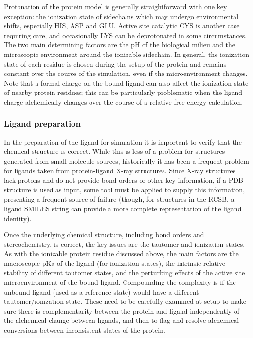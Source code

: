 \documentclass[9pt,bestpractices]{livecoms}
\begin{document}
Protonation of the protein model is generally straightforward with one key exception: the ionization state of sidechains which may undergo environmental shifts, especially HIS, ASP and GLU. Active site catalytic CYS is another case requiring care, and occasionally LYS can be deprotonated in some circumstances. The two main determining factors are the pH of the biological milieu and the microscopic environment around the ionizable sidechain. In general, the ionization state of each residue is chosen during the setup of the protein and remains constant over the course of the simulation, even if the microenvironment changes. 
Note that a formal charge on the bound ligand can also affect the ionization state of nearby protein residues; this can be particularly problematic when the ligand charge alchemically changes over the course of a relative free energy calculation.

\subsubsection{Ligand preparation}

In the preparation of the ligand for simulation it is important to verify that the chemical structure is correct. While this is less of a problem for structures generated from small-molecule sources, historically it has been a frequent problem for ligands taken from protein-ligand X-ray structures. Since X-ray structures lack protons and do not provide bond orders or other key information, if a PDB structure is used as input, some tool must be applied to supply this information, presenting a frequent source of failure (though, for structures in the RCSB, a ligand SMILES string can provide a more complete representation of the ligand identity).

Once the underlying chemical structure, including bond orders and stereochemistry, is correct, the key issues are the  tautomer and ionization states. As with the ionizable protein residue discussed above, the main factors are the macroscopic pKa of the ligand (for ionization states), the intrinsic relative stability of different tautomer states, and the perturbing effects of the active site microenvironment of the bound ligand. Compounding the complexity is if the unbound ligand (used as a reference state) would have a different tautomer/ionization state. These need to be carefully examined at setup to make sure there is complementarity between the protein and ligand independently of the alchemical change between ligands, and then to flag and resolve alchemical conversions between inconsistent states of the protein.
\end{document}
